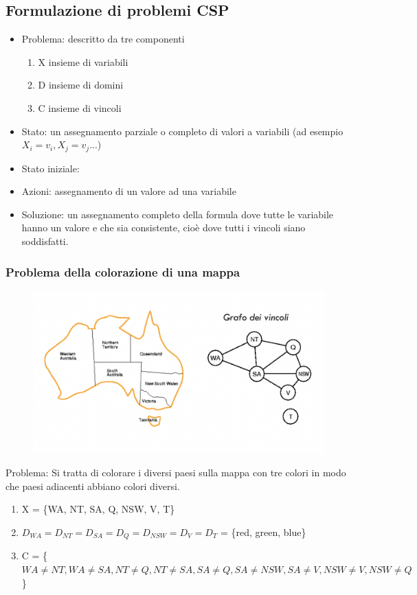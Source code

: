 \documentclass{article}
\begin{document}
\subsection{Formulazione di problemi CSP}
\begin{itemize}
    \item Problema: descritto da tre componenti
        \begin{enumerate}
        \item X insieme di variabili
        \item D insieme di domini
        \item C insieme di vincoli
        \end{enumerate}
    \item Stato: un assegnamento parziale o completo di valori a variabili (ad esempio $X_i = v_i, X_j = v_j$...)
    \item Stato iniziale: {}
    \item Azioni: assegnamento di un valore ad una variabile
    \item Soluzione: un assegnamento completo della formula dove tutte le variabile hanno un valore e che sia consistente, cioè dove tutti i vincoli siano soddisfatti.
\end{itemize}

\subsubsection{Problema della colorazione di una mappa}
\begin{figure}[h!]
\centering
\includegraphics[scale=0.35]{Images/mappacolorata.png}
\end{figure}
Problema: Si tratta di colorare i diversi paesi sulla mappa con tre colori in modo che paesi adiacenti abbiano colori diversi.
\begin{enumerate}
    \item X = \{WA, NT, SA, Q, NSW, V, T\}
    \item $D_{WA} = D_{NT} = D_{SA} = D_Q = D_{NSW} = D_{V} = D_T$ = \{red, green, blue\}
    \item C = \{$WA \neq NT, WA \neq SA, NT \neq Q, NT \neq SA, SA \neq Q, SA \neq NSW, SA \neq V, NSW \neq V, NSW \neq Q$\}
\end{enumerate}
\end{document}

